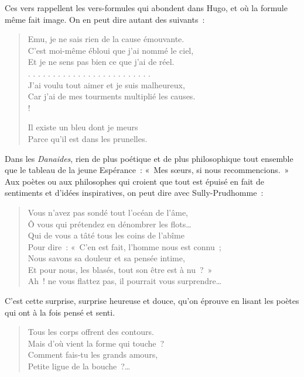 \documentclass[french,twoside]{book} %
\begin{document}
\noindent Ces vers rappellent les vers-formules qui abondent dans Hugo, et où la formule même fait image. On en peut dire autant des suivants :\par


\begin{verse}
Emu, je ne sais rien de la cause émouvante.\\
C’est moi-même ébloui que j’ai nommé le ciel,\\
Et je ne sens pas bien ce que j’ai de réel.\\
. . . . . . . . . . . . . . . . . . . . . . . . .\\
J’ai voulu tout aimer et je suis malheureux,\\
Car j’ai de mes tourments multiplié les causes.\\!

Il existe un bleu dont je meurs\\
Parce qu’il est dans les prunelles.\\
\end{verse}

\noindent Dans les \emph{Danaides}, rien de plus poétique et de plus philosophique tout ensemble que le tableau de la jeune Espérance : « Mes sœurs, si nous recommencions. » Aux poètes ou aux philosophes qui croient que tout est épuisé en fait de sentiments et d’idées inspiratives, on peut dire avec Sully-Prudhomme :\par


\begin{verse}
Vous n’avez pas sondé tout l’océan de l’âme,\\
Ô vous qui prétendez en dénombrer les flots…\\
Qui de vous a tâté tous les coins de l’abîme\\
Pour dire : « C’en est fait, l’homme nous est connu ;\\
Nous savons sa douleur et sa pensée intime,\\
Et pour nous, les blasés, tout son être est à nu ? »\\
Ah ! ne vous flattez pas, il pourrait vous surprendre…\\
\end{verse}

\noindent C’est cette surprise, surprise heureuse et douce, qu’on éprouve en lisant les poètes qui ont à la fois pensé et senti.\par


\begin{verse}
Tous les corps offrent des contours.\\
Mais d’où vient la forme qui touche ?\\
Comment fais-tu les grands amours,\\
Petite ligue de la bouche ?…\\
\end{verse}
\end{document}
